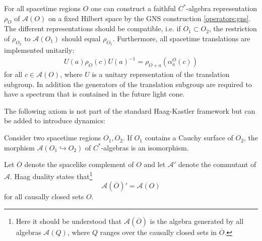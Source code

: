     \begin{axiom}[Spectrum]
        For all spacetime regions $O$ one can construct a faithful $C^*$-algebra representation $\rho_O$ of $\mathcal{A}(O)$ on a fixed Hilbert space by the GNS construction \ref{operators:gns}. The different representations should be compatible, i.e. if $O_1\subset O_2$, the restriction of $\rho_{O_2}$ to $\mathcal{A}(O_1)$ should equal $\rho_{O_1}$. Furthermore, all spacetime translations are implemented unitarily:
        \begin{gather}
            U(a)\rho_O(c)U(a)^{-1} = \rho_{O+a}(\alpha^O_a(c))
        \end{gather}
        for all $c\in\mathcal{A}(O)$, where $U$ is a unitary representation of the translation subgroup. In addition the generators of the translation subgroup are required to have a spectrum that is contained in the future light cone.
    \end{axiom}

    The following axiom is not part of the standard Haag-Kastler framework but can be added to introduce dynamics:
    \begin{axiom}
        Consider two spacetime regions $O_1,O_2$. If $O_1$ contains a Cauchy surface of $O_2$, the morphism $\mathcal{A}(O_1\hookrightarrow O_2)$ of $C^*$-algebras is an isomorphism.
    \end{axiom}

    \begin{axiom}
        Let $\overline{O}$ denote the spacelike complement of $O$ and let $\mathcal{A}'$ denote the commutant of $\mathcal{A}$. Haag duality states that\footnote{Here it should be understood that $\mathcal{A}\left(\overline{O}\right)$ is the algebra generated by all algebras $\mathcal{A}(Q)$, where $Q$ ranges over the causally closed sets in $\overline{O}$.}
        \begin{equation}
            \mathcal{A}\left(\overline{O}\right)' = \mathcal{A}(O)
        \end{equation}
        for all causally closed sets $O$.
    \end{axiom}

